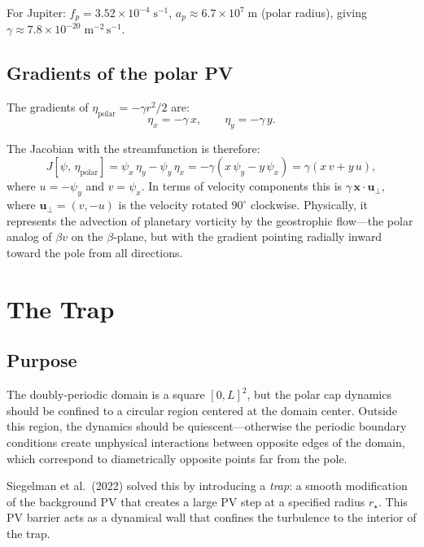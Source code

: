 \documentclass[11pt]{article}
\newcommand{\Jac}[2]{J\!\left[#1,\,#2\right]}
\begin{document}
For Jupiter: $f_p = 3.52 \times 10^{-4}\;\mathrm{s}^{-1}$, $a_p \approx 6.7\times 10^7\;\mathrm{m}$ (polar radius), giving $\gamma \approx 7.8 \times 10^{-20}\;\mathrm{m}^{-2}\,\mathrm{s}^{-1}$.

\subsection{Gradients of the polar PV}

The gradients of $\eta_{\mathrm{polar}} = -\gamma r^2/2$ are:
\begin{equation}
\eta_x = -\gamma\, x, \qquad \eta_y = -\gamma\, y.
\label{eq:eta_gradients}
\end{equation}

The Jacobian with the streamfunction is therefore:
\begin{equation}
\Jac{\psi}{\eta_{\mathrm{polar}}} = \psi_x\,\eta_y - \psi_y\,\eta_x = -\gamma\!\left(x\,\psi_y - y\,\psi_x\right) = \gamma\!\left(x\,v + y\,u\right),
\label{eq:jac_psi_eta}
\end{equation}
where $u = -\psi_y$ and $v = \psi_x$. In terms of velocity components this is $\gamma\,\bm{x}\cdot\bm{u}_\perp$, where $\bm{u}_\perp = (v, -u)$ is the velocity rotated $90^\circ$ clockwise. Physically, it represents the advection of planetary vorticity by the geostrophic flow---the polar analog of $\beta v$ on the $\beta$-plane, but with the gradient pointing radially inward toward the pole from all directions.

\section{The Trap}
\label{sec:trap}

\subsection{Purpose}

The doubly-periodic domain is a square $[0, L]^2$, but the polar cap dynamics should be confined to a circular region centered at the domain center. Outside this region, the dynamics should be quiescent---otherwise the periodic boundary conditions create unphysical interactions between opposite edges of the domain, which correspond to diametrically opposite points far from the pole.

Siegelman et al.\ (2022) solved this by introducing a \emph{trap}: a smooth modification of the background PV that creates a large PV step at a specified radius $r_\star$. This PV barrier acts as a dynamical wall that confines the turbulence to the interior of the trap.
\end{document}
